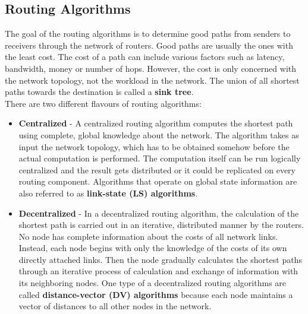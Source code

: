 \subsection{Routing Algorithms}
The goal of the routing algorithms is to determine good paths from senders to receivers through the network of routers. Good paths are usually the ones with the least cost. The cost of a path can include various factors such as latency, bandwidth, money or number of hops. However, the cost is only concerned with the network topology, not the workload in the network. The union of all shortest paths towards the destination is called a \textbf{sink tree}.\\
There are two different flavours of routing algorithms:
\begin{itemize}
\item \textbf{Centralized} - A centralized routing algorithm computes the shortest path using complete, global knowledge about the network. The algorithm takes as input the network topology, which has to be obtained somehow before the actual computation is performed. The computation itself can be run logically centralized and the result gets distributed or it could be replicated on every routing component. Algorithms that operate on global state information are also referred to as \textbf{link-state (LS) algorithms}. 
\item \textbf{Decentralized} - In a decentralized routing algorithm, the calculation of the shortest path is carried out in an iterative, distributed manner by the routers. No node has complete information about the costs of all network links. Instead, each node begins with only the knowledge of the costs of its own directly attached links. Then the node gradually calculates the shortest paths through an iterative process of calculation and exchange of information with its neighboring nodes. One type of a decentralized routing algorithms are called \textbf{distance-vector (DV) algorithms} because each node maintains a vector of distances to all other nodes in the network.
\end{itemize}

